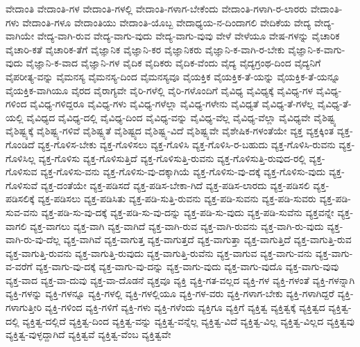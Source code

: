 {ವೇದಾಂತಿ
ವೇದಾಂತಿ-ಗಳ
ವೇದಾಂತಿ-ಗಳಲ್ಲಿ
ವೇದಾಂತಿ-ಗಳಾಗ-ಬೇಕೆಂದು
ವೇದಾಂತಿ-ಗಳಾಗಿ-ರ-ಲಾರರು
ವೇದಾಂತಿ-ಗಳು
ವೇದಾಂತಿ-ಗಳೂ
ವೇದಾಂತಿಯು
ವೇದಾಂತಿ-ಯೊಬ್ಬ
ವೇದಾಧ್ಯಯ-ನ-ದಿಂದಾಗಲಿ
ವೇದಿಕೆಯ
ವೇದ್ಯ
ವೇದ್ಯ-ವಾಗಿಯೇ
ವೇದ್ಯ-ವಾಗಿ-ರುವ
ವೇದ್ಯ-ವಾಗು-ವುದು
ವೇದ್ಯ-ವಾಗು-ವುವು
ವೇಳೆ
ವೇಳೆಯೂ
ವೇಷ-ಗಳನ್ನು
ವೈಚಾರಿಕ
ವೈಚಾರಿ-ಕತೆ
ವೈಚಾರಿಕ-ತೆಗೆ
ವೈಜ್ಞಾನಿಕ
ವೈಜ್ಞಾನಿ-ಕರ
ವೈಜ್ಞಾನಿಕರು
ವೈಜ್ಞಾನಿ-ಕ-ವಾಗಿ-ರ-ಬೇಕು
ವೈಜ್ಞಾನಿ-ಕ-ವಾಗು-ವುದು
ವೈಜ್ಞಾನಿ-ಕ-ವಾದ
ವೈಜ್ಞಾನಿ-ಗಳ
ವೈದಿಕ
ವೈದಿಕರು
ವೈದಿಕ-ವೆಂದು
ವೈದ್ಯ
ವೈದ್ಯಗ್ರಂಥ-ದಿಂದ
ವೈದ್ಯನಿಗೆ
ವೈಪರೀತ್ಯ-ವನ್ನು
ವೈಮನಸ್ಯ
ವೈಮನಸ್ಯ-ದಿಂದ
ವೈಮನಸ್ಯವೂ
ವೈಯಕ್ತಿಕ
ವೈಯಕ್ತಿಕ-ತೆ-ಯನ್ನು
ವೈಯಕ್ತಿಕ-ತೆ-ಯನ್ನೂ
ವೈಯಕ್ತಿಕ-ವಾಗಿಯೂ
ವೈರದ
ವೈರಾಗ್ಯವೇ
ವೈರಿ-ಗಳೆಲ್ಲಿ
ವೈರಿ-ಗಳೊಂದಿಗೆ
ವೈವಿಧ್ಯ
ವೈವಿಧ್ಯಕ್ಕೆ
ವೈವಿಧ್ಯ-ಗಳ
ವೈವಿಧ್ಯ-ಗಳಿಂದ
ವೈವಿಧ್ಯ-ಗಳಿದ್ದರೂ
ವೈವಿಧ್ಯ-ಗಳು
ವೈವಿಧ್ಯ-ಗಳೆಲ್ಲಾ
ವೈವಿಧ್ಯ-ಗಳೇನು
ವೈವಿಧ್ಯತೆ
ವೈವಿಧ್ಯ-ತೆ-ಗಳೆಲ್ಲ
ವೈವಿಧ್ಯ-ತೆ-ಯಲ್ಲಿ
ವೈವಿಧ್ಯದ
ವೈವಿಧ್ಯ-ದಲ್ಲಿ
ವೈವಿಧ್ಯ-ದಿಂದ
ವೈವಿಧ್ಯ-ವನ್ನು
ವೈವಿಧ್ಯ-ವೆಲ್ಲ
ವೈವಿಧ್ಯ-ವೆಲ್ಲಾ
ವೈವಿಧ್ಯವೇ
ವೈಶಿಷ್ಟ್ಯ
ವೈಶಿಷ್ಟ್ಯಕ್ಕೆ
ವೈಶಿಷ್ಟ್ಯ-ಗಳಿವೆ
ವೈಶಿಷ್ಟ್ಯತೆ
ವೈಶಿಷ್ಟ್ಯದ
ವೈಶಿಷ್ಟ್ಯ-ವಿದೆ
ವೈಶಿಷ್ಟ್ಯವೇ
ವೈಶೇಷಿಕ-ಗಳಂತೆಯೇ
ವ್ಯಕ್ತ
ವ್ಯಕ್ತಕ್ಕಿಂತ
ವ್ಯಕ್ತ-ಗೊಂಡಿದೆ
ವ್ಯಕ್ತ-ಗೊಳಿಸ-ಬೇಕು
ವ್ಯಕ್ತ-ಗೊಳಿಸಲು
ವ್ಯಕ್ತ-ಗೊಳಿಸಿ
ವ್ಯಕ್ತ-ಗೊಳಿಸಿ-ರ-ಬಹುದು
ವ್ಯಕ್ತ-ಗೊಳಿಸಿ-ರುವನು
ವ್ಯಕ್ತ-ಗೊಳಿಸಿಲ್ಲ
ವ್ಯಕ್ತ-ಗೊಳಿಸು
ವ್ಯಕ್ತ-ಗೊಳಿಸುತ್ತಿದೆ
ವ್ಯಕ್ತ-ಗೊಳಿಸುತ್ತಿ-ರುವನು
ವ್ಯಕ್ತ-ಗೊಳಿಸುತ್ತಿ-ರುವುದ-ರಲ್ಲಿ
ವ್ಯಕ್ತ-ಗೊಳಿಸುವ
ವ್ಯಕ್ತ-ಗೊಳಿಸು-ವನು
ವ್ಯಕ್ತ-ಗೊಳಿಸು-ವು-ದಕ್ಕಾಗಿಯೆ
ವ್ಯಕ್ತ-ಗೊಳಿಸು-ವು-ದಕ್ಕೆ
ವ್ಯಕ್ತ-ಗೊಳಿಸು-ವುದು
ವ್ಯಕ್ತ-ಗೊಳಿಸುವೆ
ವ್ಯಕ್ತ-ದಂತೆಯೇ
ವ್ಯಕ್ತ-ಪಡಿಸದೆ
ವ್ಯಕ್ತ-ಪಡಿಸ-ಬೇಕಾ-ಗಿದೆ
ವ್ಯಕ್ತ-ಪಡಿಸ-ಲಾರದು
ವ್ಯಕ್ತ-ಪಡಿಸಲಿ
ವ್ಯಕ್ತ-ಪಡಿಸಲಿಕ್ಕೆ
ವ್ಯಕ್ತ-ಪಡಿಸಲು
ವ್ಯಕ್ತ-ಪಡಿಸಿತು
ವ್ಯಕ್ತ-ಪಡಿ-ಸುತ್ತಿ-ರುವನು
ವ್ಯಕ್ತ-ಪಡಿ-ಸುವನು
ವ್ಯಕ್ತ-ಪಡಿ-ಸುವರು
ವ್ಯಕ್ತ-ಪಡಿ-ಸುವ-ವನು
ವ್ಯಕ್ತ-ಪಡಿ-ಸು-ವು-ದಕ್ಕೆ
ವ್ಯಕ್ತ-ಪಡಿ-ಸು-ವು-ದನ್ನು
ವ್ಯಕ್ತ-ಪಡಿ-ಸು-ವುದು
ವ್ಯಕ್ತ-ಪಡಿ-ಸುವೆನು
ವ್ಯಕ್ತವನ್ನೇ
ವ್ಯಕ್ತ-ವಾಗಲಿ
ವ್ಯಕ್ತ-ವಾಗಲು
ವ್ಯಕ್ತ-ವಾಗಿ
ವ್ಯಕ್ತ-ವಾಗಿದೆ
ವ್ಯಕ್ತ-ವಾಗಿ-ರುವ
ವ್ಯಕ್ತ-ವಾಗಿ-ರುವನು
ವ್ಯಕ್ತ-ವಾಗಿ-ರು-ವುದು
ವ್ಯಕ್ತ-ವಾಗಿ-ರು-ವು-ದೆಲ್ಲ
ವ್ಯಕ್ತ-ವಾಗಿವೆ
ವ್ಯಕ್ತ-ವಾಗುತ್ತ
ವ್ಯಕ್ತ-ವಾಗುತ್ತದೆ
ವ್ಯಕ್ತ-ವಾಗುತ್ತಾ
ವ್ಯಕ್ತ-ವಾಗುತ್ತಿದೆ
ವ್ಯಕ್ತ-ವಾಗುತ್ತಿ-ರುವ
ವ್ಯಕ್ತ-ವಾಗುತ್ತಿ-ರುವನು
ವ್ಯಕ್ತ-ವಾಗುತ್ತಿ-ರುವುದು
ವ್ಯಕ್ತ-ವಾಗುತ್ತಿ-ರುವೆನು
ವ್ಯಕ್ತ-ವಾಗುವ
ವ್ಯಕ್ತ-ವಾಗು-ವನು
ವ್ಯಕ್ತ-ವಾಗು-ವ-ವರೆಗೆ
ವ್ಯಕ್ತ-ವಾಗು-ವು-ದಕ್ಕೆ
ವ್ಯಕ್ತ-ವಾಗು-ವು-ದನ್ನು
ವ್ಯಕ್ತ-ವಾಗು-ವುದು
ವ್ಯಕ್ತ-ವಾಗು-ವುದೊ
ವ್ಯಕ್ತ-ವಾಗು-ವುವು
ವ್ಯಕ್ತ-ವಾದ
ವ್ಯಕ್ತ-ವಾ-ದುವು
ವ್ಯಕ್ತ-ವಾ-ದೊಡನೆ
ವ್ಯಕ್ತವೂ
ವ್ಯಕ್ತಿ
ವ್ಯಕ್ತಿ-ಗತ-ವಲ್ಲದ
ವ್ಯಕ್ತಿ-ಗಳ
ವ್ಯಕ್ತಿ-ಗಳಂತೆ
ವ್ಯಕ್ತಿ-ಗಳನ್ನಾಗಿ
ವ್ಯಕ್ತಿ-ಗಳನ್ನು
ವ್ಯಕ್ತಿ-ಗಳನ್ನೂ
ವ್ಯಕ್ತಿ-ಗಳಲ್ಲಿ
ವ್ಯಕ್ತಿ-ಗಳಲ್ಲಿಯೂ
ವ್ಯಕ್ತಿ-ಗಳ-ವರು
ವ್ಯಕ್ತಿ-ಗಳಾಗ-ಬೇಕು
ವ್ಯಕ್ತಿ-ಗಳಾಗಿದ್ದರೆ
ವ್ಯಕ್ತಿ-ಗಳಾಗುತ್ತೀರಿ
ವ್ಯಕ್ತಿ-ಗಳಿಂದ
ವ್ಯಕ್ತಿ-ಗಳಿಗೆ
ವ್ಯಕ್ತಿ-ಗಳು
ವ್ಯಕ್ತಿ-ಗಳೆಂದು
ವ್ಯಕ್ತಿಗೂ
ವ್ಯಕ್ತಿಗೆ
ವ್ಯಕ್ತಿತ್ವ
ವ್ಯಕ್ತಿತ್ವಕ್ಕೆ
ವ್ಯಕ್ತಿತ್ವದ
ವ್ಯಕ್ತಿತ್ವ-ದಲ್ಲಿ
ವ್ಯಕ್ತಿತ್ವ-ದಲ್ಲಿದೆ
ವ್ಯಕ್ತಿತ್ವ-ದಿಂದ
ವ್ಯಕ್ತಿತ್ವ-ವನ್ನು
ವ್ಯಕ್ತಿತ್ವ-ವನ್ನೆಲ್ಲ
ವ್ಯಕ್ತಿತ್ವ-ವಿದೆ
ವ್ಯಕ್ತಿತ್ವ-ವಿಲ್ಲ
ವ್ಯಕ್ತಿತ್ವ-ವಿಲ್ಲದ
ವ್ಯಕ್ತಿತ್ವವು
ವ್ಯಕ್ತಿತ್ವ-ವುಳ್ಳದ್ದಾಗಿದೆ
ವ್ಯಕ್ತಿತ್ವವೆ
ವ್ಯಕ್ತಿತ್ವ-ವೆಂಬ
ವ್ಯಕ್ತಿತ್ವವೇ
}
